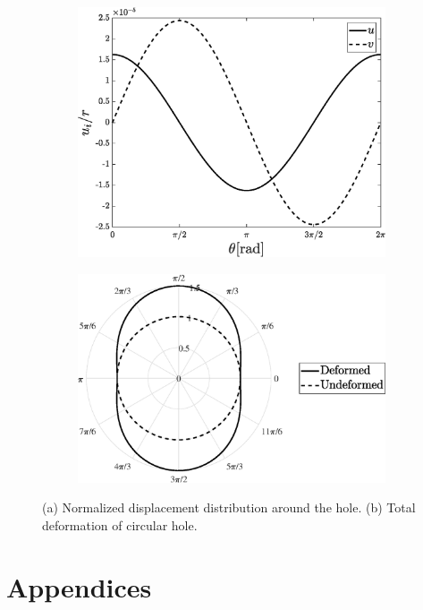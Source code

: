 \documentclass{article}
\begin{document}
\begin{figure}[H]
        \begin{subfigure}{0.5\textwidth}
            \includegraphics[width=1\linewidth]{figures/displacement.eps} 
            \caption{}
            \label{fig:displacement}
        \end{subfigure}
        \begin{subfigure}{0.5\textwidth}
            \includegraphics[width=1\linewidth]{figures/deformation.eps} 
            \caption{}
            \label{fig:deformation}
        \end{subfigure}
    \caption{(a) Normalized displacement distribution around the hole. (b) Total deformation of circular hole.}
\end{figure}

\appendix
\section*{Appendices}










\newpage


\end{document}
